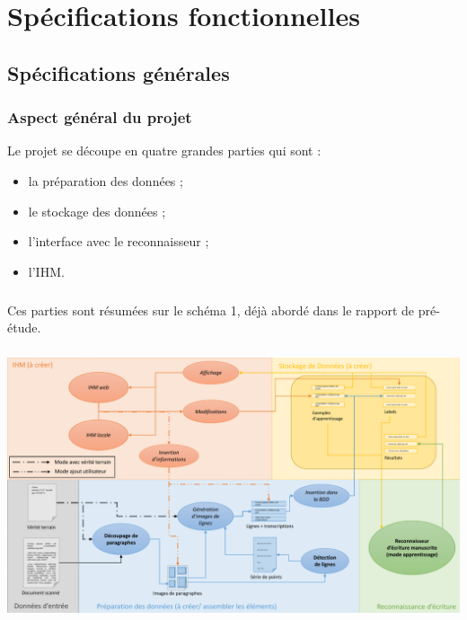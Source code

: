 \chapter{Spécifications fonctionnelles}

\section{Spécifications générales}

\subsection{Aspect général du projet}

Le projet se découpe en quatre grandes parties qui sont :
\begin{itemize}
	\item la préparation des données ;
	\item le stockage des données ;
	\item l'interface avec le reconnaisseur ;
	\item l'IHM.
\end{itemize}

\paragraph{}
Ces parties sont résumées sur le schéma 1, déjà abordé dans le rapport de
pré-étude.

\paragraph{}
\begin{mdframed}[frametitle={Figure 1 : Décomposition du projet (mode apprentissage)}, innerbottommargin=10]
\begin{center}
\includegraphics[width=\linewidth]{schema_mode1.1.pdf}
\end{center}
\end{mdframed}

